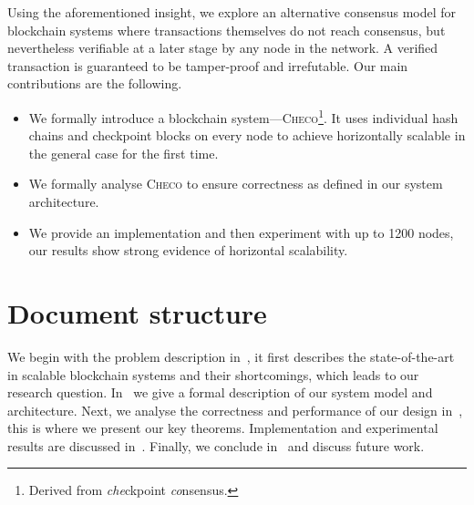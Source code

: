 Using the aforementioned insight,
we explore an alternative consensus model for blockchain systems where transactions themselves do not reach consensus,
but nevertheless verifiable at a later stage by any node in the network.
A verified transaction is guaranteed to be tamper-proof and irrefutable.
Our main contributions are the following.
\begin{itemize}
    \item We formally introduce a blockchain system---\textsc{Checo}\footnote{Derived from \emph{che}ckpoint \emph{co}nsensus.}.
        It uses individual hash chains and checkpoint blocks on every node to achieve
        horizontally scalable in the general case for the first time.
    \item We formally analyse \textsc{Checo} to ensure correctness as defined in our system architecture.
    \item We provide an implementation and then experiment with up to 1200 nodes,
        our results show strong evidence of horizontal scalability.
\end{itemize}

\section{Document structure}
We begin with the problem description in~,
it first describes the state-of-the-art in scalable blockchain systems and their shortcomings,
which leads to our research question.
In~ we give a formal description of our system model and architecture.
Next, we analyse the correctness and performance of our design in~, this is where we present our key theorems.
Implementation and experimental results are discussed in~.
Finally, we conclude in~ and discuss future work.
